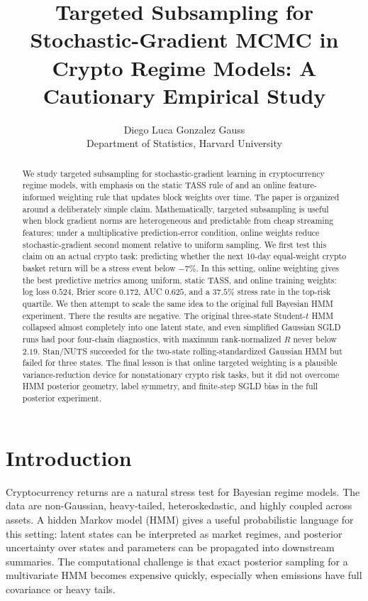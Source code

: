 \documentclass{article}
\title{Targeted Subsampling for Stochastic-Gradient MCMC in Crypto Regime Models: A Cautionary Empirical Study}
\author{
  Diego Luca Gonzalez Gauss \\
  Department of Statistics, Harvard University
}
\newcommand{\1}{\mathbf{1}}
\begin{document}
\maketitle

\begin{abstract}
We study targeted subsampling for stochastic-gradient learning in cryptocurrency regime models, with emphasis on the static TASS rule of \citet{ou2024tass} and an online feature-informed weighting rule that updates block weights over time. The paper is organized around a deliberately simple claim. Mathematically, targeted subsampling is useful when block gradient norms are heterogeneous and predictable from cheap streaming features; under a multiplicative prediction-error condition, online weights reduce stochastic-gradient second moment relative to uniform sampling. We first test this claim on an actual crypto task: predicting whether the next 10-day equal-weight crypto basket return will be a stress event below $-7\%$. In this setting, online weighting gives the best predictive metrics among uniform, static TASS, and online training weights: log loss $0.524$, Brier score $0.172$, AUC $0.625$, and a $37.5\%$ stress rate in the top-risk quartile. We then attempt to scale the same idea to the original full Bayesian HMM experiment. There the results are negative. The original three-state Student-$t$ HMM collapsed almost completely into one latent state, and even simplified Gaussian SGLD runs had poor four-chain diagnostics, with maximum rank-normalized $\hat R$ never below $2.19$. Stan/NUTS succeeded for the two-state rolling-standardized Gaussian HMM but failed for three states. The final lesson is that online targeted weighting is a plausible variance-reduction device for nonstationary crypto risk tasks, but it did not overcome HMM posterior geometry, label symmetry, and finite-step SGLD bias in the full posterior experiment.
\end{abstract}

\tableofcontents

\section{Introduction}

Cryptocurrency returns are a natural stress test for Bayesian regime models. The data are non-Gaussian, heavy-tailed, heteroskedastic, and highly coupled across assets. A hidden Markov model (HMM) gives a useful probabilistic language for this setting: latent states can be interpreted as market regimes, and posterior uncertainty over states and parameters can be propagated into downstream summaries. The computational challenge is that exact posterior sampling for a multivariate HMM becomes expensive quickly, especially when emissions have full covariance or heavy tails.
\end{document}
